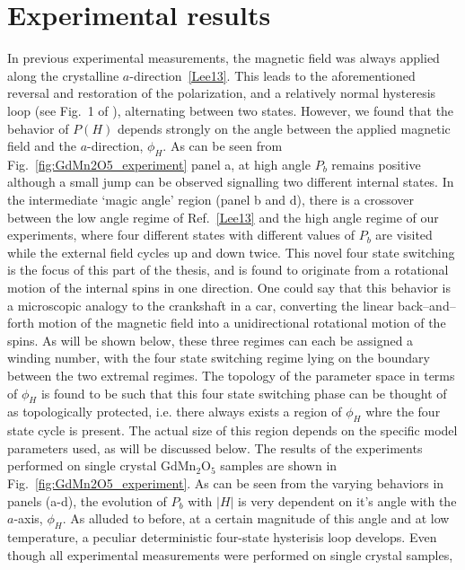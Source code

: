 \section{Experimental results}
In previous experimental measurements, the magnetic field was always applied along the crystalline $a$-direction~\ref{Lee13}.
This leads to the aforementioned reversal and restoration of the polarization, and a relatively normal hysteresis loop (see Fig.~1 of \cite{Lee13}), alternating between two states. However, we found that the behavior of $P(H)$ depends strongly on the angle between the applied magnetic field and the $a$-direction, $\phi_H$.
As can be seen from Fig.~\ref{fig:GdMn2O5_experiment} panel a, at high angle $P_b$ remains positive although a small jump can be observed signalling two different internal states.
In the intermediate `magic angle' region (panel b and d), there is a crossover between the low angle regime of Ref.~\ref{Lee13} and the high angle regime of our experiments, where four different states with different values of $P_b$ are visited while the external field cycles up and down twice.
This novel four state switching is the focus of this part of the thesis, and is found to originate from a rotational motion of the internal spins in one direction.
One could say that this behavior is a microscopic analogy to the crankshaft in a car, converting the linear back--and--forth motion of the magnetic field into a unidirectional rotational motion of the spins.
As will be shown below, these three regimes can each be assigned a winding number, with the four state switching regime lying on the boundary between the two extremal regimes.
The topology of the parameter space in terms of $\phi_H$ is found to be such that this four state switching phase can be thought of as topologically protected, i.e. there always exists a region of $\phi_H$ whre the four state cycle is present. The actual size of this region depends on the specific model parameters used, as will be discussed below.
The results of the experiments performed on single crystal GdMn$_2$O$_5$ samples are shown in Fig.~\ref{fig:GdMn2O5_experiment}. As can be seen from the varying behaviors in panels (a-d), the evolution of $P_b$ with $|H|$ is very dependent on it's angle with the $a$-axis, $\phi_H$.
As alluded to before, at a certain magnitude of this angle and at low temperature, a peculiar deterministic four-state hysterisis loop develops.
Even though all experimental measurements were performed on single crystal samples, 
